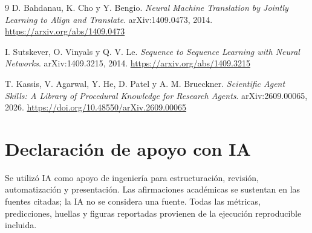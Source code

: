 \documentclass[11pt,letterpaper]{article}
\begin{document}
\begin{thebibliography}{9}
D. Bahdanau, K. Cho y Y. Bengio.
\emph{Neural Machine Translation by Jointly Learning to Align and Translate}.
arXiv:1409.0473, 2014. \url{https://arxiv.org/abs/1409.0473}

I. Sutskever, O. Vinyals y Q. V. Le.
\emph{Sequence to Sequence Learning with Neural Networks}.
arXiv:1409.3215, 2014. \url{https://arxiv.org/abs/1409.3215}

T. Kassis, V. Agarwal, Y. He, D. Patel y A. M. Brueckner.
\emph{Scientific Agent Skills: A Library of Procedural Knowledge for Research Agents}.
arXiv:2609.00065, 2026. \url{https://doi.org/10.48550/arXiv.2609.00065}
\end{thebibliography}

\section*{Declaración de apoyo con IA}

Se utilizó IA como apoyo de ingeniería para estructuración, revisión, automatización y presentación. Las
afirmaciones académicas se sustentan en las fuentes citadas; la IA no se considera una fuente. Todas las
métricas, predicciones, huellas y figuras reportadas provienen de la ejecución reproducible incluida.
\end{document}
